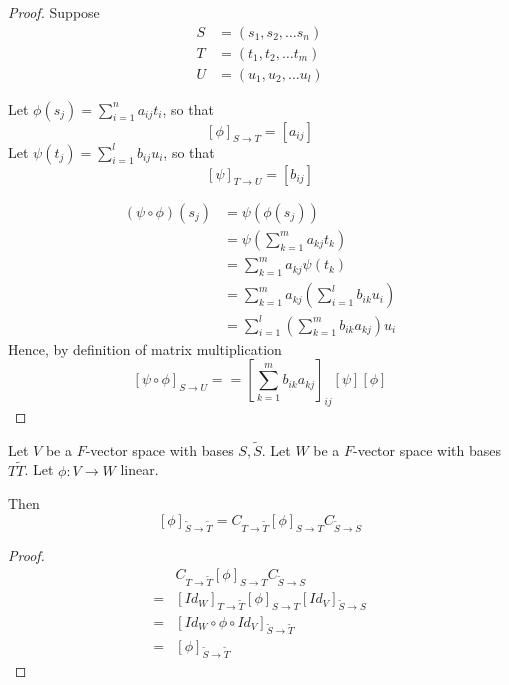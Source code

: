 \begin{proof}
    Suppose 
    \begin{align*}
        S &= \left( s_1, s_2, \hdots s_n \right)  \\
        T &= \left( t_1, t_2, \hdots t_m \right)  \\
        U &= \left( u_1, u_2, \hdots u_l \right)
    \end{align*}

    Let $\phi(s_j) = \sum\limits_{i=1}^{n} a_{ij} t_i $, so that 
    \[
        \left[ \phi \right]_{S \to T} = \left[ a_{ij} \right] 
    \]
    Let $\psi(t_j) = \sum\limits_{i = 1}^{l} b_{ij} u_i$, so that 
    \[
        \left[ \psi \right]_{T \to U} = \left[ b_{ij} \right] 
    \]

    \begin{align*}
        \left( \psi \circ \phi \right) (s_j) &= \psi \left( \phi(s_j) \right)  \\
        &= \psi \left( \sum\limits_{k = 1}^{m} a_{kj} t_k  \right)  \\
        &= \sum\limits_{k = 1}^{m}  a_{kj} \psi \left( t_k \right)  \\
        &= \sum\limits_{k= 1}^{m}  a_{kj} \left( \sum\limits_{i = 1}^{l}  b_{ik} u_i\right)  \\
        &= \sum\limits_{i = 1}^{l} \left( \sum\limits_{k = 1}^{m} b_{ik} a_{kj} \right) u_i
    \end{align*} 
    Hence, by definition of matrix multiplication
    \[
        \left[ \psi \circ \phi \right]_{S \to U} = = \left[ \sum\limits_{k = 1}^{m} b_{ik} a_{kj}\right]_{ij}  \left[ \psi \right] \left[ \phi \right] 
    \]
\end{proof}

\begin{corollary}
    Let $V$ be a $F$-vector space with bases $S, \tilde{S}$. Let $W$ be a $F$-vector space with bases $T \tilde{T}$. Let $\phi : V \to W$ linear.  

    Then 
    \[
        \left[ \phi \right]_{\tilde{S} \to \tilde{T}} = C_{T \to \tilde{T}} \left[ \phi \right]_{S \to T} C_{ \tilde{S} \to S}
    \]
\end{corollary}

\begin{proof}
    \begin{align*}
        & C_{T \to \tilde{T}} \left[ \phi \right]_{S \to T} C_{\tilde{S} \to S} \\
        =& \left[ Id_W \right]_{T \to \tilde{T}} \left[ \phi \right]_{S \to T} \left[ Id_V \right]_{\tilde{S} \to S} \\
        =& \left[ Id_W \circ \phi \circ Id_V \right]_{\tilde{S} \to \tilde{T}} \\
        =& \left[ \phi \right]_{\tilde{S} \to \tilde{T}}
    \end{align*}
\end{proof}

